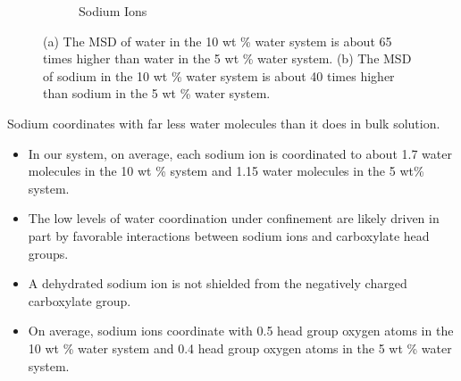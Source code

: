 \documentclass{article}
\begin{document}
\begin{figure}[!htb]
\begin{subfigure}{0.45\textwidth}
  \caption{Sodium Ions}\label{fig:na_msd_comparison}
  \end{subfigure}
  \caption{(a) The MSD of water in the 10 wt \% water system is about 65 times
  higher than water in the 5 wt \% water system. (b) The MSD of sodium in the
  10 wt \% water system is about 40 times higher than sodium in the 5 wt \% 
  water system.}\label{fig:msd_comparison}
  \end{figure}
  
  \noindent Sodium coordinates with far less water molecules than it does in 
  bulk solution.
  \begin{itemize}
    \item In our system, on average, each sodium ion is coordinated to about 1.7 
    water molecules in the 10 wt \% system and 1.15 water molecules in the 5 wt\% 
    system.
    \item The low levels of water coordination under confinement are likely driven
    in part by favorable interactions between sodium ions and carboxylate head groups.
    \item A dehydrated sodium ion is not shielded from the negatively charged 
    carboxylate group.~\cite{ma_drastically_2019}
    \item On average, sodium ions coordinate with 0.5 head group oxygen atoms in the
    10 wt \% water system and 0.4 head group oxygen atoms in the 5 wt \% water system. 
  \end{itemize}
  
\end{document}
